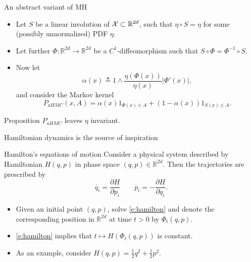 \documentclass[10pt]{beamer}
\def\blank{\vspace{.5\textheight}}
\begin{document}
\begin{frame}{An abstract variant of MH}
\begin{itemize}
  \item Let $S$ be a linear involution of $\mathcal{X}\subset\mathbb{R}^{2d}$, such that $\eta\circ S = \eta$ for some (possibly unnormalized) PDF $\eta$.
  \vspace{2.5cm}
  \item Let further $\Phi:\mathbb{R}^{2d}\rightarrow \mathbb{R}^{2d}$ be a $C^1$-diffeomorphism such that $S\circ \Phi = \Phi^{-1}\circ S$.
  \item Now let 
\begin{equation}
    \label{e:acceptance_probability_abstract_HMC}
    \alpha(x) \triangleq 1\wedge \frac{\eta(\Phi(x))}{\eta(x)} \vert\Phi'(x)\vert,
\end{equation}
and consider the Markov kernel
$$
P_{aHMC}(x,A) = \alpha(x) 1_{\Phi(x)\in A} + (1-\alpha(x))1_{S(x)\in A}.
$$
\end{itemize}
\begin{block}{Proposition}
$P_{aHMC}$ leaves $\eta$ invariant.
\end{block}
\end{frame}

\begin{frame}{Hamiltonian dynamics is the source of inspiration}
\begin{block}{Hamilton's equations of motion}
Consider a physical system described by Hamiltonian $H(q,p)$ in phase space $(q,p)\in \mathbb{R}^{2d}$. Then the trajectories are prescribed by
\begin{equation}
  \label{e:hamilton}
  \dot{q_i} = \frac{\partial H}{\partial p_i} \qquad \dot{p_i} = -\frac{\partial H}{\partial q_i}.
\end{equation}
\end{block}
\begin{itemize}
  \item Given an initial point $(q,p)$, solve \eqref{e:hamilton} and denote the corresponding position in $\mathbb{R}^{2d}$ at time $t>0$ by $\Phi_t(q,p)$.
  \item \eqref{e:hamilton} implies that $t\mapsto H(\Phi_t(q,p))$ is constant.
  \item As an example, consider $H(q,p) = \frac12 q^2 + \frac12 p^2.$
\end{itemize}
\blank
\end{frame}
\end{document}
